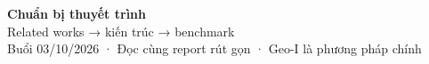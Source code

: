 \documentclass[10pt,a4paper]{article}
\begin{document}
\begin{center}
{\LARGE\bfseries\color{ink}Chuẩn bị thuyết trình}\\[5pt]
{\large Related works → kiến trúc → benchmark}\\[3pt]
{\small Buổi 03/10/2026 · Đọc cùng report rút gọn · Geo-I là phương pháp chính}
\end{center}



\clearpage


\clearpage


\clearpage

\end{document}
